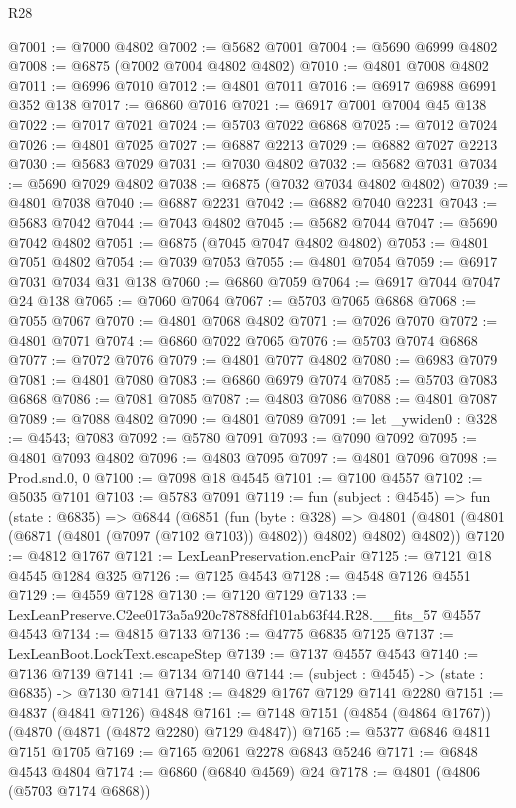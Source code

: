 \begin{lexlean}{R28}
\begin{coremodule}
@7001 := @7000 @4802
@7002 := @5682 @7001
@7004 := @5690 @6999 @4802
@7008 := @6875 (@7002 @7004 @4802 @4802)
@7010 := @4801 @7008 @4802
@7011 := @6996 @7010
@7012 := @4801 @7011
@7016 := @6917 @6988 @6991 @352 @138
@7017 := @6860 @7016
@7021 := @6917 @7001 @7004 @45 @138
@7022 := @7017 @7021
@7024 := @5703 @7022 @6868
@7025 := @7012 @7024
@7026 := @4801 @7025
@7027 := @6887 @2213
@7029 := @6882 @7027 @2213
@7030 := @5683 @7029
@7031 := @7030 @4802
@7032 := @5682 @7031
@7034 := @5690 @7029 @4802
@7038 := @6875 (@7032 @7034 @4802 @4802)
@7039 := @4801 @7038
@7040 := @6887 @2231
@7042 := @6882 @7040 @2231
@7043 := @5683 @7042
@7044 := @7043 @4802
@7045 := @5682 @7044
@7047 := @5690 @7042 @4802
@7051 := @6875 (@7045 @7047 @4802 @4802)
@7053 := @4801 @7051 @4802
@7054 := @7039 @7053
@7055 := @4801 @7054
@7059 := @6917 @7031 @7034 @31 @138
@7060 := @6860 @7059
@7064 := @6917 @7044 @7047 @24 @138
@7065 := @7060 @7064
@7067 := @5703 @7065 @6868
@7068 := @7055 @7067
@7070 := @4801 @7068 @4802
@7071 := @7026 @7070
@7072 := @4801 @7071
@7074 := @6860 @7022 @7065
@7076 := @5703 @7074 @6868
@7077 := @7072 @7076
@7079 := @4801 @7077 @4802
@7080 := @6983 @7079
@7081 := @4801 @7080
@7083 := @6860 @6979 @7074
@7085 := @5703 @7083 @6868
@7086 := @7081 @7085
@7087 := @4803 @7086
@7088 := @4801 @7087
@7089 := @7088 @4802
@7090 := @4801 @7089
@7091 := let _ywiden0 : @328 := @4543; @7083
@7092 := @5780 @7091
@7093 := @7090 @7092
@7095 := @4801 @7093 @4802
@7096 := @4803 @7095
@7097 := @4801 @7096
@7098 := Prod.snd.{0, 0}
@7100 := @7098 @18 @4545
@7101 := @7100 @4557
@7102 := @5035 @7101
@7103 := @5783 @7091
@7119 := fun (subject : @4545) =>
  fun (state : @6835) =>
  @6844
    (@6851
      (fun (byte : @328) =>
      @4801 (@4801 (@4801 (@6871 (@4801 (@7097 (@7102 @7103)) @4802)) @4802) @4802) @4802))
@7120 := @4812 @1767
@7121 := LexLeanPreservation.encPair
@7125 := @7121 @18 @4545 @1284 @325
@7126 := @7125 @4543
@7128 := @4548 @7126 @4551
@7129 := @4559 @7128
@7130 := @7120 @7129
@7133 := LexLeanPreserve.C2ee0173a5a920c78788fdf101ab63f44.R28.__fits_57 @4557 @4543
@7134 := @4815 @7133
@7136 := @4775 @6835 @7125
@7137 := LexLeanBoot.LockText.escapeStep
@7139 := @7137 @4557 @4543
@7140 := @7136 @7139
@7141 := @7134 @7140
@7144 := (subject : @4545) -> (state : @6835) -> @7130 @7141
@7148 := @4829 @1767 @7129 @7141 @2280
@7151 := @4837 (@4841 @7126) @4848
@7161 := @7148 @7151 (@4854 (@4864 @1767)) (@4870 (@4871 (@4872 @2280) @7129 @4847))
@7165 := @5377 @6846 @4811 @7151 @1705
@7169 := @7165 @2061 @2278 @6843 @5246
@7171 := @6848 @4543 @4804
@7174 := @6860 (@6840 @4569) @24
@7178 := @4801 (@4806 (@5703 @7174 @6868))

\end{coremodule}
\end{lexlean}
